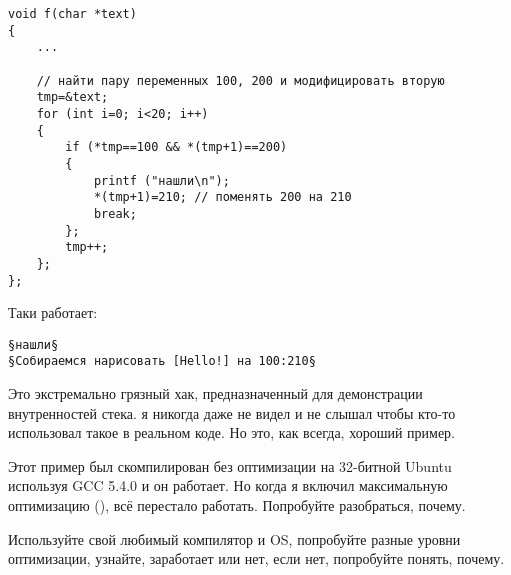 \begin{lstlisting}[style=customc]
void f(char *text)
{
	...

	// найти пару переменных 100, 200 и модифицировать вторую
	tmp=&text;
	for (int i=0; i<20; i++)
	{
		if (*tmp==100 && *(tmp+1)==200)
		{
			printf ("нашли\n");
			*(tmp+1)=210; // поменять 200 на 210
			break;
		};
		tmp++;
	};
};
\end{lstlisting}

Таки работает:

\begin{lstlisting}
§нашли§
§Собираемся нарисовать [Hello!] на 100:210§
\end{lstlisting}


Это экстремально грязный хак, предназначенный для демонстрации внутренностей стека.
я никогда даже не видел и не слышал чтобы кто-то использовал такое в реальном коде.
Но это, как всегда, хороший пример.

\myparagraph{\Exercise}

Этот пример был скомпилирован без оптимизации на 32-битной Ubuntu используя GCC 5.4.0 и он работает.
Но когда я включил максимальную оптимизацию (), всё перестало работать.
Попробуйте разобраться, почему.

Используйте свой любимый компилятор и OS, попробуйте разные уровни оптимизации, узнайте, заработает или нет,
если нет, попробуйте понять, почему.

